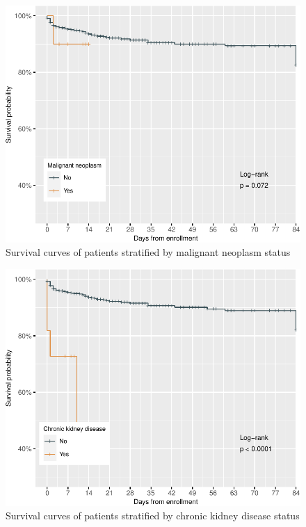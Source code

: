 \documentclass[
  10pt,
]{article}
\begin{document}
\newpage
\begin{figure}[h]

{\centering \includegraphics{results_files/figure-latex/neoplasm-1} 

}

\caption{Survival curves of patients stratified by malignant neoplasm status}\label{fig:neoplasm}
\end{figure}

\newpage
\begin{figure}[h]

{\centering \includegraphics{results_files/figure-latex/ckd-1} 

}

\caption{Survival curves of patients stratified by chronic kidney disease status}\label{fig:ckd}
\end{figure}
\end{document}
